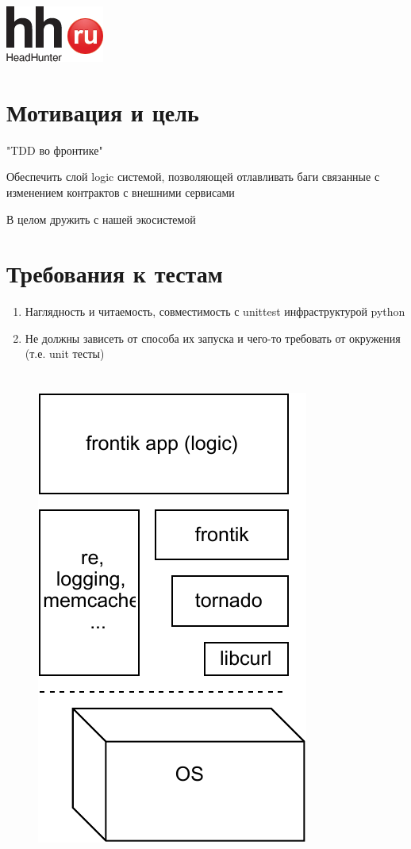 \documentclass[12pt]{article}
\begin{document}
\includegraphics{logo.png}
\TitleSlide

\section{Мотивация и цель}
"TDD во фронтике"

Обеспечить слой logic системой, позволяющей отлавливать баги связанные с изменением контрактов с внешними сервисами

В целом дружить с нашей экосистемой

\section{Требования к тестам}

\begin{enumerate}
\item Наглядность и читаемость, совместимость с unittest инфраструктурой python
\item Не должны зависеть от способа их запуска и чего-то требовать от окружения (т.е. unit тесты)
\end{enumerate}

\section{}
\begin{figure}
\includegraphics[page=1, scale=1]{frontikarchitecture.pdf}
%
\end{figure}
\end{document}
